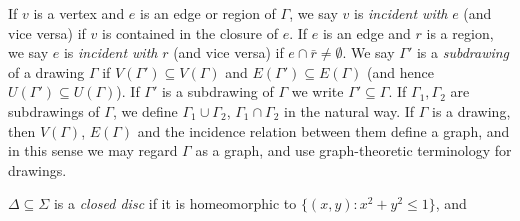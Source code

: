 If $v$ is a vertex and $e$ is an edge or region of $\Gamma$, we say $v$ is \textit{incident with} $e$ (and vice versa) if $v$ is contained in the closure of $e$. If $e$ is an edge and $r$ is a region, we say $e$ is \textit{incident with} $r$ (and vice versa) if $e \cap \bar{r} \ne \emptyset$. We say $\Gamma'$ is a \textit{subdrawing} of a drawing $\Gamma$ if $V(\Gamma') \subseteq V(\Gamma)$ and $E(\Gamma') \subseteq E(\Gamma)$ (and hence $U(\Gamma') \subseteq U(\Gamma)$). If $\Gamma'$ is a subdrawing of $\Gamma$ we write $\Gamma' \subseteq \Gamma$. If $\Gamma_1, \Gamma_2$ are subdrawings of $\Gamma$, we define $\Gamma_1 \cup \Gamma_2$, $\Gamma_1 \cap \Gamma_2$ in the natural way. If $\Gamma$ is a drawing, then $V(\Gamma)$, $E(\Gamma)$ and the incidence relation between them define a graph, and in this sense we may regard $\Gamma$ as a graph, and use graph-theoretic terminology for drawings.

$\Delta \subseteq \Sigma$ is a \textit{closed disc} if it is homeomorphic to $\{(x, y) : x^2 + y^2 \le 1\}$, and
